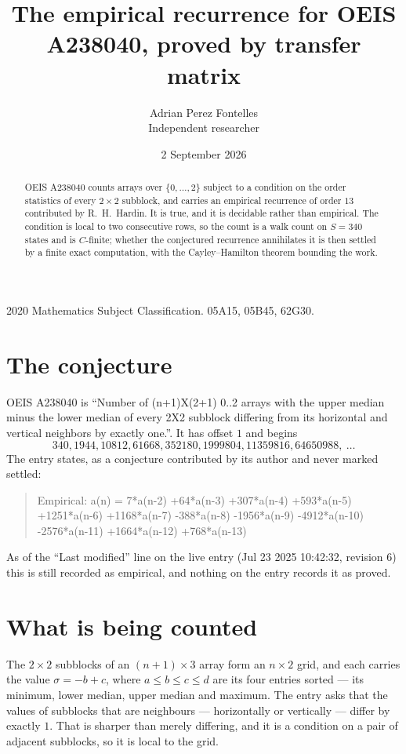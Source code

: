 \documentclass[11pt,a4paper]{article}
\title{The empirical recurrence for OEIS A238040, proved by transfer matrix}
\author{Adrian Perez Fontelles\\ \small Independent researcher}
\date{2 September 2026}
\theoremstyle{plain}
\theoremstyle{definition}
\begin{document}
\maketitle

\begin{abstract}
OEIS A238040 counts arrays over $\{0,\dots,2\}$ subject to a condition on the order
statistics of every $2\times2$ subblock, and carries an empirical recurrence of order
$13$ contributed by R.~H.~Hardin. It is true, and it is decidable rather than empirical.
The condition is local to two consecutive rows, so the count is a walk count on $S=340$
states and is $C$-finite; whether the conjectured recurrence annihilates it is then settled by
a finite exact computation, with the Cayley--Hamilton theorem bounding the work.
\end{abstract}

\noindent\small 2020 Mathematics Subject Classification. 05A15, 05B45, 62G30.\normalsize

\section{The conjecture}

OEIS A238040 is ``Number of (n+1)X(2+1) 0..2 arrays with the upper median minus the lower median of every 2X2 subblock differing from its horizontal and vertical neighbors by exactly one.''. It has offset $1$ and begins
\[
340, 1944, 10812, 61668, 352180, 1999804, 11359816, 64650988,\ \dots
\]
The entry states, as a conjecture contributed by its author and never marked settled:
\begin{quote}
Empirical: a(n) = 7*a(n-2) +64*a(n-3) +307*a(n-4) +593*a(n-5) +1251*a(n-6) +1168*a(n-7) -388*a(n-8) -1956*a(n-9) -4912*a(n-10) -2576*a(n-11) +1664*a(n-12) +768*a(n-13)
\end{quote}
As of the ``Last modified'' line on the live entry (Jul 23 2025 10:42:32, revision 6) this is still
recorded as empirical, and nothing on the entry records it as proved.

\section{What is being counted}

The $2\times2$ subblocks of an $(n+1)\times3$ array form an
$n\times2$ grid, and each carries the value $\sigma=-b+c$, where $a\le b\le c\le d$ are its four entries sorted --- its minimum, lower median, upper median and maximum. The entry asks that the values of
subblocks that are neighbours --- horizontally or vertically --- differ by exactly $1$.
That is sharper than merely differing, and it is a condition on a pair of adjacent subblocks,
so it is local to the grid.
\end{document}
